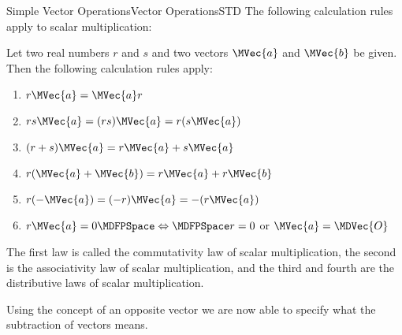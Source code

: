 \begin{MXContent}{Simple Vector Operations}{Vector Operations}{STD}
The following calculation rules apply to scalar multiplication:


\begin{MInfo}
Let two real numbers $r$ and $s$ and two vectors $\MVec{a}$ and $\MVec{b}$ be given. Then 
the following calculation rules apply:
\begin{enumerate}
 \item $r\MVec{a}=\MVec{a}r$
 \item $r s\MVec{a}=(r s)\MVec{a}=r(s\MVec{a})$
 \item $(r+s)\MVec{a}=r\MVec{a}+s\MVec{a}$
 \item $r(\MVec{a}+\MVec{b})=r\MVec{a}+r\MVec{b}$
 \item $r(-\MVec{a})=(-r)\MVec{a}=-(r\MVec{a})$
 \item $r\MVec{a}=0\MDFPSpace\Leftrightarrow\MDFPSpace r=0$ or $\MVec{a}=\MDVec{O}$
\end{enumerate}
The first law is called the commutativity law of scalar multiplication, the second is the 
associativity law of scalar multiplication, and the third and fourth are the distributive laws 
of scalar multiplication.
\end{MInfo}

Using the concept of an opposite vector we are now able to specify what the subtraction of vectors means.


\end{MXContent}
